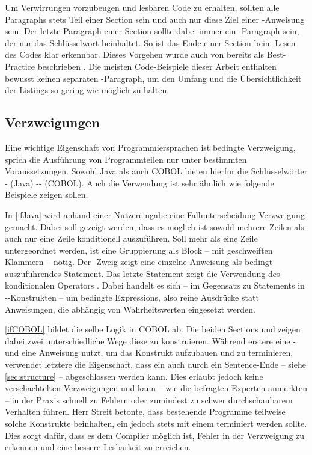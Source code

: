 Um Verwirrungen vorzubeugen und lesbaren Code zu erhalten, sollten alle Paragraphs stets Teil einer Section sein und auch nur diese Ziel einer -Anweisung sein. Der letzte Paragraph einer Section sollte dabei immer ein -Paragraph sein, der nur das Schlüsselwort  beinhaltet. So ist das Ende einer Section beim Lesen des Codes klar erkennbar. Dieses Vorgehen wurde auch von \citeauthor{richards_enhancing_1984} bereits \citeyear{richards_enhancing_1984} als Best-Practice beschrieben  \cite{richards_enhancing_1984}. Die meisten Code-Beispiele dieser Arbeit enthalten bewusst keinen separaten -Paragraph, um den Umfang und die Übersichtlichkeit der Listings so gering wie möglich zu halten. 

\subsection{Verzweigungen}
Eine wichtige Eigenschaft von Programmiersprachen ist bedingte Verzweigung, sprich die Ausführung von Programmteilen nur unter bestimmten Voraussetzungen. Sowohl Java als auch COBOL bieten hierfür die Schlüsselwörter - (Java) \bzw {}-- (COBOL). Auch die Verwendung ist sehr ähnlich wie folgende Beispiele zeigen sollen.


In \autoref{ifJava} wird anhand einer Nutzereingabe eine Fallunterscheidung \bzw Verzweigung gemacht. Dabei soll gezeigt werden, dass es möglich ist sowohl mehrere Zeilen als auch nur eine Zeile konditionell auszuführen. Soll mehr als eine Zeile untergeordnet werden, ist eine Gruppierung als Block -- mit geschweiften Klammern -- nötig. Der -Zweig zeigt eine einzelne Anweisung als bedingt auszuführendes Statement. Das letzte Statement zeigt die Verwendung des konditionalen Operators . Dabei handelt es sich -- im Gegensatz zu Statements in --Konstrukten -- um bedingte Expressions, also reine Ausdrücke statt Anweisungen, die abhängig von Wahrheitswerten eingesetzt werden.


\autoref{ifCOBOL} bildet die selbe Logik in COBOL ab. Die beiden Sections  und  zeigen dabei zwei unterschiedliche Wege diese zu konstruieren. Während erstere eine - und eine  Anweisung nutzt, um das Konstrukt aufzubauen und zu terminieren, verwendet letztere die Eigenschaft, dass ein  auch durch ein Sentence-Ende -- siehe \autoref{sec:structure} -- abgeschlossen werden kann. Dies erlaubt jedoch keine verschachtelten Verzweigungen und kann -- wie die befragten Experten anmerkten -- in der Praxis schnell zu Fehlern oder zumindest zu schwer durchschaubarem Verhalten führen. Herr Streit betonte, dass bestehende Programme teilweise solche Konstrukte beinhalten, ein  jedoch stets mit einem  terminiert werden sollte. Dies sorgt dafür, dass es dem Compiler möglich ist, Fehler in der Verzweigung zu erkennen und eine bessere Lesbarkeit zu erreichen.

